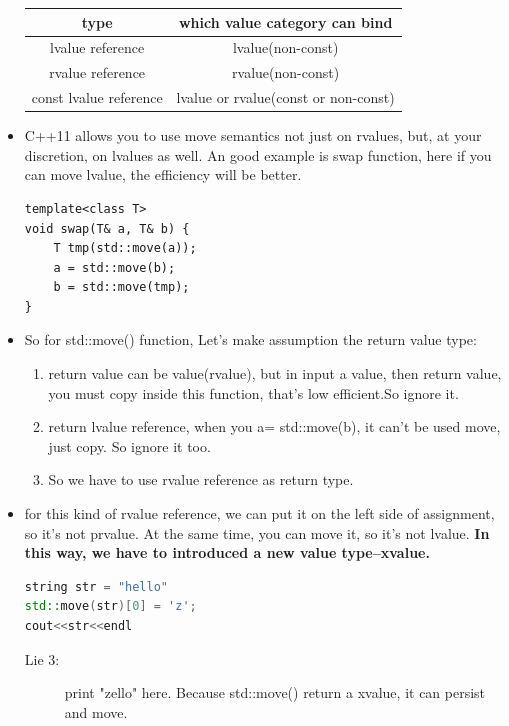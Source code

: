 \documentclass[a4paper,11pt,twoside]{book}
\newcommand{\tophline}{\hline }
\newcommand{\bottomhline}{\\ \hline }
\newcommand{\tophline}{ }
\newcommand{\bottomhline}{ }
\begin{document}
\begin{itemize}
\begin{center}
	\begin{tabular}{|c|c|}
		\tophline 
		type & which value category can bind \\ 
		\tophline 
		lvalue reference & lvalue(non-const)  \\ 
		\tophline 
		rvalue reference &  rvalue(non-const)\\ 
		\tophline 
		const lvalue reference & lvalue or rvalue(const or non-const)  \bottomhline 
	\end{tabular} 
\end{center}

	\item C++11 allows you to use move semantics not just on rvalues, but, at your discretion, on lvalues as well. An good example is swap function, here if you can move lvalue, the efficiency will be better. 
	
\begin{lstlisting}[numbers=none]
template<class T> 
void swap(T& a, T& b) { 
	T tmp(std::move(a));
	a = std::move(b); 
	b = std::move(tmp);
} 
\end{lstlisting}
	
	\item So for std::move() function, Let's make assumption the return value type:
	\begin{enumerate}
		\item return value can be value(rvalue), but in input a value, then return value, you must copy inside this function, that's low efficient.So ignore it.
		
		\item return lvalue reference, when you a= std::move(b), it can't be used move, just copy. So ignore it too.
		
		\item So we have to use rvalue reference as return type.
	\end{enumerate}
	
	\item for this kind of rvalue reference, we can put it on the left side of assignment, so it's not prvalue. At the same time, you can move it, so it's not lvalue.  \textbf{In this way, we have to introduced a new value type--xvalue.}    
\begin{lstlisting}[frame=single, language=c++, mathescape=true]
string str = "hello"
std::move(str)[0] = 'z';
cout<<str<<endl 
\end{lstlisting}
\begin{description}
	\item[Lie 3:] print "zello" here. Because std::move() return a xvalue, it can persist and move.
\end{description}
	

\end{itemize}
\end{document}
